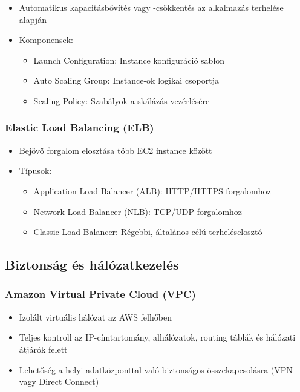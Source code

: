 \documentclass[a4paper,12pt]{article}
\begin{document}
    \begin{itemize}
        \item Automatikus kapacitásbővítés vagy -csökkentés az alkalmazás terhelése alapján
        \item Komponensek:
        \begin{itemize}
            \item Launch Configuration: Instance konfiguráció sablon
            \item Auto Scaling Group: Instance-ok logikai csoportja
            \item Scaling Policy: Szabályok a skálázás vezérlésére
        \end{itemize}
    \end{itemize}

    \subsubsection{Elastic Load Balancing (ELB)}

    \begin{itemize}
        \item Bejövő forgalom elosztása több EC2 instance között
        \item Típusok:
        \begin{itemize}
            \item Application Load Balancer (ALB): HTTP/HTTPS forgalomhoz
            \item Network Load Balancer (NLB): TCP/UDP forgalomhoz
            \item Classic Load Balancer: Régebbi, általános célú terheléselosztó
        \end{itemize}
    \end{itemize}

    \subsection{Biztonság és hálózatkezelés}

    \subsubsection{Amazon Virtual Private Cloud (VPC)}

    \begin{itemize}
        \item Izolált virtuális hálózat az AWS felhőben
        \item Teljes kontroll az IP-címtartomány, alhálózatok, routing táblák és hálózati átjárók felett
        \item Lehetőség a helyi adatközponttal való biztonságos összekapcsolásra (VPN vagy Direct Connect)
    \end{itemize}
\end{document}
